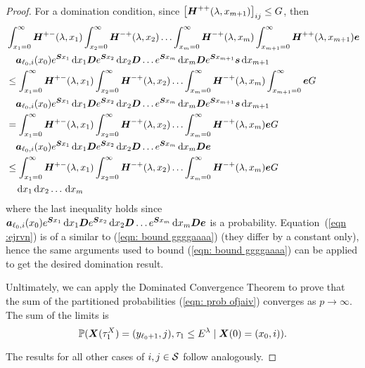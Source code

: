 \begin{proof}
	For a domination condition, since \(\left[\boldsymbol H^{++}(\lambda,x_{m+1})\right]_{ij}\leq G\), then 
	\begin{align}
			&\int_{x_1=0}^\infty \boldsymbol H^{+-}(\lambda,x_1)\nonumber
		\int_{x_2=0}^\infty \boldsymbol H^{-+}(\lambda,x_2) 
		\hdots \int_{x_m=0}^\infty \boldsymbol H^{-+}(\lambda, x_m) 
		\int_{x_{m+1}=0}^\infty \boldsymbol H^{++}(\lambda,x_{m+1}) \boldsymbol e 
		\\&\quad\boldsymbol   a_{\ell_0,i}(x_0)e^{\boldsymbol{S}x_1}\, \mathrm{d} x_1 \boldsymbol{D}e^{\boldsymbol{S}x_2} \, \mathrm{d} x_2 \boldsymbol{D}\dots e^{\boldsymbol{S}x_m} \, \mathrm{d} x_m \boldsymbol{D}e^{\boldsymbol{S}x_{m+1}}{\boldsymbol s} \, \mathrm{d} x_{m+1}\nonumber 
			\\&\leq \int_{x_1=0}^\infty \boldsymbol H^{+-}(\lambda,x_1)\nonumber
		\int_{x_2=0}^\infty \boldsymbol H^{-+}(\lambda,x_2) 
		\hdots \int_{x_m=0}^\infty \boldsymbol H^{-+}(\lambda, x_m) 
		\int_{x_{m+1}=0}^\infty \boldsymbol e G
		\\&\quad\boldsymbol   a_{\ell_0,i}(x_0)e^{\boldsymbol{S}x_1}\, \mathrm{d} x_1 \boldsymbol{D}e^{\boldsymbol{S}x_2} \, \mathrm{d} x_2 \boldsymbol{D}\dots e^{\boldsymbol{S}x_m} \, \mathrm{d} x_m \boldsymbol{D}e^{\boldsymbol{S}x_{m+1}}{\boldsymbol s} \, \mathrm{d} x_{m+1}\nonumber
		\\&=\int_{x_1=0}^\infty \boldsymbol H^{+-}(\lambda,x_1)\nonumber
		\int_{x_2=0}^\infty \boldsymbol H^{-+}(\lambda,x_2) 
		\hdots \int_{x_m=0}^\infty \boldsymbol H^{-+}(\lambda, x_m) 
		 \boldsymbol e G
		\\&\quad\boldsymbol   a_{\ell_0,i}(x_0)e^{\boldsymbol{S}x_1}\, \mathrm{d} x_1 \boldsymbol{D}e^{\boldsymbol{S}x_2} \, \mathrm{d} x_2 \boldsymbol{D}\dots e^{\boldsymbol{S}x_m} \, \mathrm{d} x_m \boldsymbol{D}{\boldsymbol e}\nonumber
			\\&\leq\int_{x_1=0}^\infty \boldsymbol H^{+-}(\lambda,x_1)\nonumber
		\int_{x_2=0}^\infty \boldsymbol H^{-+}(\lambda,x_2) 
		\hdots \int_{x_m=0}^\infty \boldsymbol H^{-+}(\lambda, x_m) 
		 \boldsymbol e G
		\\&\quad \, \mathrm{d} x_1 \, \mathrm{d} x_2\dots \, \mathrm{d} x_m \label{eqn :ejrvn}
	\end{align}
	where the last inequality holds since \(\boldsymbol a_{\ell_0,i}(x_0)e^{\boldsymbol{S}x_1}\, \mathrm{d} x_1 \boldsymbol{D}e^{\boldsymbol{S}x_2} \, \mathrm{d} x_2 \boldsymbol{D}\dots e^{\boldsymbol{S}x_m} \, \mathrm{d} x_m \boldsymbol{D}{\boldsymbol e}\) is a probability. Equation~(\ref{eqn :ejrvn}) is of a similar to (\ref{eqn: bound ggggaaaa}) (they differ by a constant only), hence the same arguments used to bound (\ref{eqn: bound ggggaaaa}) can be applied to get the desired domination result. 
	
	Unltimately, we can apply the Dominated Convergence Theorem to prove that the sum of the partitioned probabilities (\ref{eqn: prob ofjaiv}) converges as \(p\to\infty\). The sum of the limits is 
	\[\mathbb P(\boldsymbol X(\tau_1^X) = (y_{\ell_0+1}, j), \tau_{1}\leq E^\lambda 
            	 \mid \boldsymbol X(0) = (x_0,i)).\]
	 
	 The results for all other cases of \(i,j\in\mathcal{S}\) follow analogously.
\end{proof}


